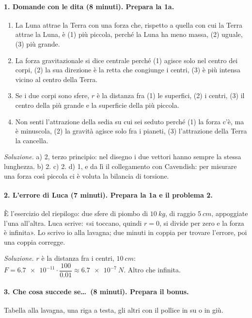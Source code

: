 \documentclass[11pt]{report}
\begin{document}
\paragraph{1. Domande con le dita (8 minuti). Prepara la 1a.}
\begin{enumerate}[label=\alph*)]
  \item La Luna attrae la Terra con una forza che, rispetto a quella con
  cui la Terra attrae la Luna, è (1) più piccola, perché la Luna ha meno
  massa, (2) uguale, (3) più grande.
  \item La forza gravitazionale si dice centrale perché (1) agisce solo nel
  centro dei corpi, (2) la sua direzione è la retta che congiunge i centri,
  (3) è più intensa vicino al centro della Terra.
  \item Se i due corpi sono sfere, $r$ è la distanza fra (1) le superfici,
  (2) i centri, (3) il centro della più grande e la superficie della più
  piccola.
  \item Non senti l'attrazione della sedia su cui sei seduto perché (1) la
  forza c'è, ma è minuscola, (2) la gravità agisce solo fra i pianeti,
  (3) l'attrazione della Terra la cancella.
\end{enumerate}

\emph{Soluzione.} a) 2, terzo principio: nel disegno i due vettori hanno
sempre la stessa lunghezza. b) 2. c) 2. d) 1, e da lì il collegamento con
Cavendish: per misurare una forza così piccola ci è voluta la bilancia di
torsione.

\paragraph{2. L'errore di Luca (7 minuti). Prepara la 1a e il problema 2.}
È l'esercizio del riepilogo: due sfere di piombo di $\SI{10}{kg}$, di
raggio $\SI{5}{cm}$, appoggiate l'una all'altra. Luca scrive: «si toccano,
quindi $r = 0$, si divide per zero e la forza è infinita». Lo scrivo io
alla lavagna; due minuti in coppia per trovare l'errore, poi una coppia
corregge.

\emph{Soluzione.} $r$ è la distanza fra i centri, $\SI{10}{cm}$:
$F = \num{6.7e-11} \cdot \dfrac{100}{\num{0.01}} \approx \SI{6.7e-7}{N}$.
Altro che infinita.

\paragraph{3. Che cosa succede se\dots\ (8 minuti). Prepara il bonus.}
Tabella alla lavagna, una riga a testa, gli altri con il pollice in su o
in giù.
\end{document}

